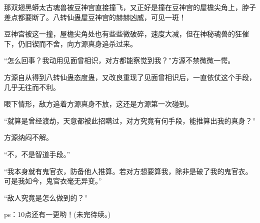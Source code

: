 \begin{this_body}
那双翅黑蟒太古魂兽被豆神宫直接撞飞，又正好是撞在豆神宫的屋檐尖角上，脖子差点都要断了。八转仙蛊屋豆神宫的赫赫凶威，可见一斑！

豆神宫被这一撞，屋檐尖角处也有些些微破碎，速度大减，但在神秘魂兽的狂催下，仍旧锲而不舍，向方源真身追杀过来。

“怎么回事？我动用见面曾相识，对方都能察觉到我？”方源不禁微微一愕。

方源自从得到八转仙蛊态度蛊，又改良重现了见面曾相识后，一直依仗这个手段，几乎无往而不利。

眼下情形，敌方追着方源真身不放，这还是方源第一次碰到。

“就算是曾经渡劫，天意都被此招瞒过，对方究竟有何手段，能推算出我的真身？”

方源纳闷不解。

“不，不是智道手段。”

“我本身就有鬼官衣，防备他人推算。若对方想要算我，除非是破了我的鬼官衣。可是我如今，鬼官衣毫无异变。”

“敌人究竟是怎么做到的？”

ps：10点还有一更哟！(未完待续。)

\end{this_body}

